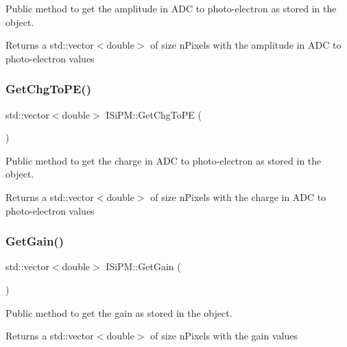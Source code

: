 Public method to get the amplitude in A\+DC to photo-\/electron as stored in the object. 

\begin{DoxyReturn}{Returns}
a std\+::vector$<$double$>$ of size n\+Pixels with the amplitude in A\+DC to photo-\/electron values 
\end{DoxyReturn}
\mbox{\label{classISiPM_ab6246048aee23e50fe66262dde6a6e78}} 
\subsubsection{\texorpdfstring{Get\+Chg\+To\+P\+E()}{GetChgToPE()}}
{\footnotesize\ttfamily std\+::vector$<$double$>$ I\+Si\+P\+M\+::\+Get\+Chg\+To\+PE (\begin{DoxyParamCaption}{ }\end{DoxyParamCaption})}



Public method to get the charge in A\+DC to photo-\/electron as stored in the object. 

\begin{DoxyReturn}{Returns}
a std\+::vector$<$double$>$ of size n\+Pixels with the charge in A\+DC to photo-\/electron values 
\end{DoxyReturn}
\mbox{\label{classISiPM_aac9fd397344bc7ca1263cc91edc61118}} 
\subsubsection{\texorpdfstring{Get\+Gain()}{GetGain()}}
{\footnotesize\ttfamily std\+::vector$<$double$>$ I\+Si\+P\+M\+::\+Get\+Gain (\begin{DoxyParamCaption}{ }\end{DoxyParamCaption})}



Public method to get the gain as stored in the object. 

\begin{DoxyReturn}{Returns}
a std\+::vector$<$double$>$ of size n\+Pixels with the gain values 
\end{DoxyReturn}
\mbox{\label{classISiPM_ad8b5408dd198cc4e70f2cdc8244e69c2}} 
